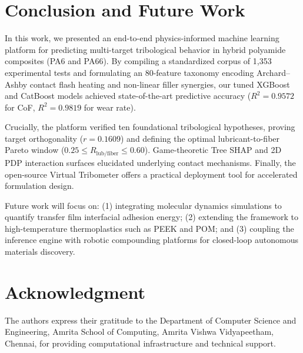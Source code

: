 \documentclass[10pt,twocolumn,a4paper]{article}
\begin{document}
\section{Conclusion and Future Work}
\label{sec:conclusion}
In this work, we presented an end-to-end physics-informed machine learning platform for predicting multi-target tribological behavior in hybrid polyamide composites (PA6 and PA66). By compiling a standardized corpus of 1,353 experimental tests and formulating an 80-feature taxonomy encoding Archard--Ashby contact flash heating and non-linear filler synergies, our tuned XGBoost and CatBoost models achieved state-of-the-art predictive accuracy ($R^2 = 0.9572$ for CoF, $R^2 = 0.9819$ for wear rate).

Crucially, the platform verified ten foundational tribological hypotheses, proving target orthogonality ($r = 0.1609$) and defining the optimal lubricant-to-fiber Pareto window ($0.25 \le R_{\text{lub/fiber}} \le 0.60$). Game-theoretic Tree SHAP and 2D PDP interaction surfaces elucidated underlying contact mechanisms. Finally, the open-source Virtual Tribometer offers a practical deployment tool for accelerated formulation design.

Future work will focus on: (1) integrating molecular dynamics simulations to quantify transfer film interfacial adhesion energy; (2) extending the framework to high-temperature thermoplastics such as PEEK and POM; and (3) coupling the inference engine with robotic compounding platforms for closed-loop autonomous materials discovery.

\section*{Acknowledgment}
The authors express their gratitude to the Department of Computer Science and Engineering, Amrita School of Computing, Amrita Vishwa Vidyapeetham, Chennai, for providing computational infrastructure and technical support.



\end{document}
